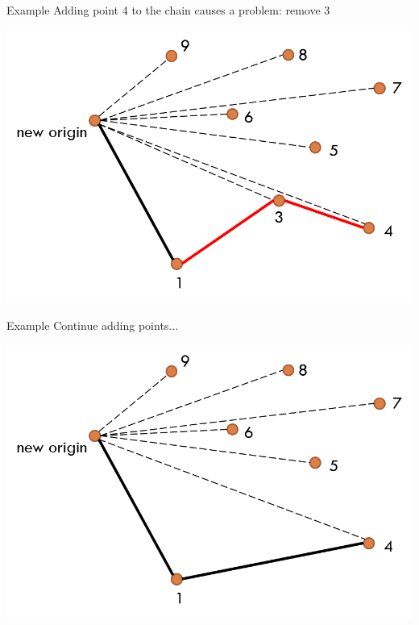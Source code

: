 \documentclass[13pt,onlymath]{beamer}
\begin{document}
\begin{frame}{Example}
Adding point 4 to the chain causes a problem: remove 3
\begin{center}
\includegraphics[height=0.5\textheight]{figures/graham5}
\end{center}
\end{frame}

\begin{frame}{Example}
Continue adding points...
\begin{center}
\includegraphics[height=0.5\textheight]{figures/graham6}
\end{center}
\end{frame}
\end{document}
